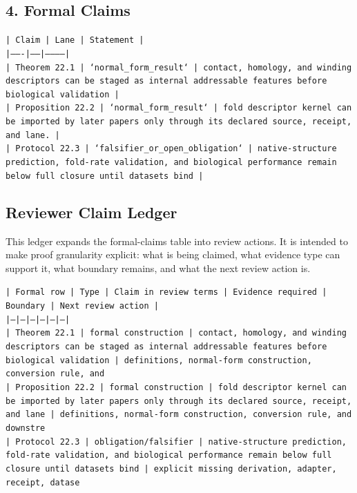 \documentclass[11pt]{article}
\begin{document}
\subsection*{4. Formal Claims}

\noindent\texttt{| Claim | Lane | Statement |}\\
\noindent\texttt{|-------|------|-----------|}\\
\noindent\texttt{| Theorem 22.1 | `normal\_form\_result` | contact, homology, and winding descriptors can be staged as internal addressable features before biological validation |}\\
\noindent\texttt{| Proposition 22.2 | `normal\_form\_result` | fold descriptor kernel can be imported by later papers only through its declared source, receipt, and lane. |}\\
\noindent\texttt{| Protocol 22.3 | `falsifier\_or\_open\_obligation` | native-structure prediction, fold-rate validation, and biological performance remain below full closure until datasets bind |}\\

\subsection*{Reviewer Claim Ledger}

This ledger expands the formal-claims table into review actions. It is intended to make proof granularity explicit: what is being claimed, what evidence type can support it, what boundary remains, and what the next review action is.

\noindent\texttt{| Formal row | Type | Claim in review terms | Evidence required | Boundary | Next review action |}\\
\noindent\texttt{|---|---|---|---|---|---|}\\
\noindent\texttt{| Theorem 22.1 | formal construction | contact, homology, and winding descriptors can be staged as internal addressable features before biological validation | definitions, normal-form construction, conversion rule, and }\\
\noindent\texttt{| Proposition 22.2 | formal construction | fold descriptor kernel can be imported by later papers only through its declared source, receipt, and lane | definitions, normal-form construction, conversion rule, and downstre}\\
\noindent\texttt{| Protocol 22.3 | obligation/falsifier | native-structure prediction, fold-rate validation, and biological performance remain below full closure until datasets bind | explicit missing derivation, adapter, receipt, datase}\\
\end{document}
